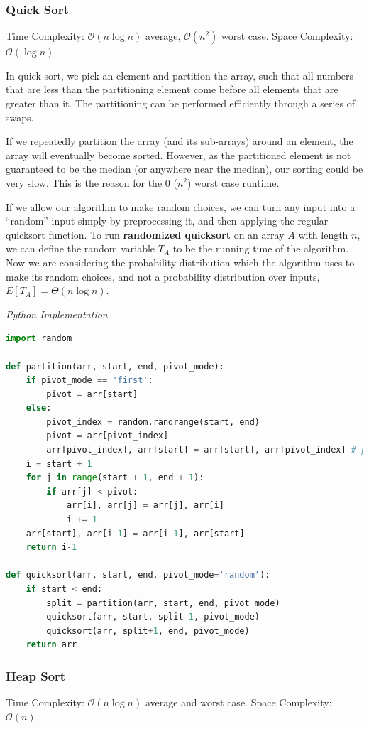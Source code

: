 \documentclass{article}
\newcommand{\bigO}{\mathcal{O}}
\begin{document}
    \subsubsection{Quick Sort}
     Time Complexity: $\bigO (n \log n)$ average, $\bigO (n^2)$ worst case. Space Complexity: $\bigO (\log n )$
     
     In quick sort, we pick an element and partition the array, such that all numbers that are less than the partitioning element come before all elements that are greater than it. The partitioning can be performed efficiently through a series of swaps.

    If we repeatedly partition the array (and its sub-arrays) around an element, the array will eventually become sorted. However, as the partitioned element is not guaranteed to be the median (or anywhere near the median), our sorting could be very slow. This is the reason for the 0 ($n^2$) worst case runtime.
    
    If we allow our algorithm to make random choices, we can turn any input into a ``random” input simply by preprocessing it, and then applying the regular quicksort function. To run \textbf{randomized quicksort} on an array $A$ with length $n$, we can define the random variable $T_A$ to be the running time of the algorithm. Now we are considering the probability distribution which the algorithm uses to make its random choices, and not a probability distribution over inputs, $E[T_A] = \Theta(n \log{n})$.
    
\vspace{8pt} \emph{Python Implementation}
\begin{lstlisting}[language=Python]
import random

def partition(arr, start, end, pivot_mode):
	if pivot_mode == 'first':
		pivot = arr[start]
	else:
		pivot_index = random.randrange(start, end)
		pivot = arr[pivot_index]
		arr[pivot_index], arr[start] = arr[start], arr[pivot_index] # place the pivot at the start
	i = start + 1
	for j in range(start + 1, end + 1):
		if arr[j] < pivot:
			arr[i], arr[j] = arr[j], arr[i]
			i += 1
	arr[start], arr[i-1] = arr[i-1], arr[start]
	return i-1

def quicksort(arr, start, end, pivot_mode='random'):
	if start < end:
		split = partition(arr, start, end, pivot_mode)
		quicksort(arr, start, split-1, pivot_mode)
		quicksort(arr, split+1, end, pivot_mode)
	return arr
\end{lstlisting}
    
    \subsubsection{Heap Sort}
    Time Complexity: $\bigO(n \log n)$ average and worst case. Space Complexity: $\bigO (n)$
    
\end{document}
